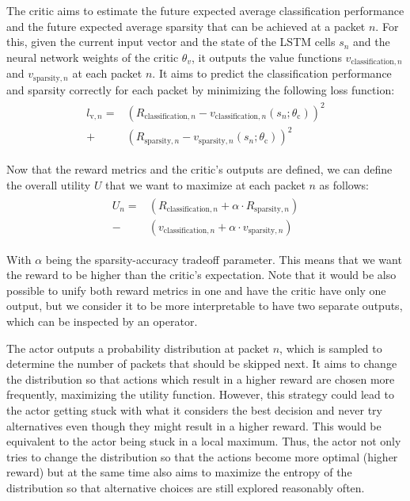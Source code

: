 \documentclass[conference]{IEEEtran}
\begin{document}
The critic aims to estimate the future expected average classification performance and the future expected average sparsity that can be achieved at a packet $n$. For this, given the current input vector and the state of the LSTM cells $s_n$ and the neural network weights of the critic $\theta_v$, it outputs the value functions $v_{\text{classification},n}$ and $v_{\text{sparsity},n}$ at each packet $n$. It aims to predict the classification performance and sparsity correctly for each packet by minimizing the following loss function:
\begin{align}
\begin{split}
l_{\text{v},n} =& \left(R_{\text{classification},n} - v_{\text{classification},n}\left(s_n ; \theta_\text{c} \right)\right)^2 \\
+ & \left(R_{\text{sparsity},n} - v_{\text{sparsity},n}\left(s_n ; \theta_\text{c} \right)\right)^2
\end{split}
\end{align}

Now that the reward metrics and the critic's outputs are defined, we can define the overall utility $U$ that we want to maximize at each packet $n$ as follows:
\begin{align}
\begin{split}
U_n =& \left(R_{\text{classification},n} + \alpha \cdot R_{\text{sparsity},n}\right) \\
- & \left(v_{\text{classification},n} + \alpha \cdot v_{\text{sparsity},n}\right)
\end{split}
\end{align}

With $\alpha$ being the sparsity-accuracy tradeoff parameter. This means that we want the reward to be higher than the critic's expectation. Note that it would be also possible to unify both reward metrics in one and have the critic have only one output, but we consider it to be more interpretable to have two separate outputs, which can be inspected by an operator.

The actor outputs a probability distribution at packet $n$, which is sampled to determine the number of packets that should be skipped next. It aims to change the distribution so that actions which result in a higher reward are chosen more frequently, maximizing the utility function. However, this strategy could lead to the actor getting stuck with what it considers the best decision and never try alternatives even though they might result in a higher reward. This would be equivalent to the actor being stuck in a local maximum. Thus, the actor not only tries to change the distribution so that the actions become more optimal (higher reward) but at the same time also aims to maximize the entropy of the distribution so that alternative choices are still explored reasonably often.
\end{document}
